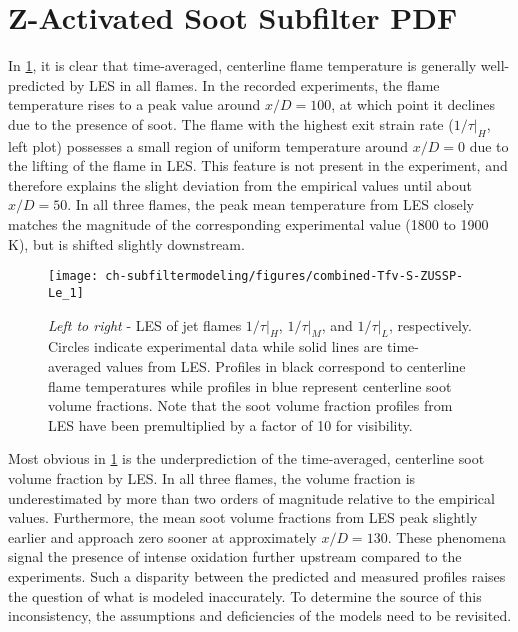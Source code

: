 \section{Z-Activated Soot Subfilter PDF}
\label{sec:lesresults:zassp}

In \cref{fig:subfilter:leszussp:zusspleseval}, it is clear that time-averaged, centerline flame temperature is generally well-predicted by LES in all flames. In the recorded experiments, the flame temperature rises to a peak value around $x/D = 100$, at which point it declines due to the presence of soot. The flame with the highest exit strain rate ($1/\tau|_H$, left plot) possesses a small region of uniform temperature around $x/D = 0$ due to the lifting of the flame in LES. This feature is not present in the experiment, and therefore explains the slight deviation from the empirical values until about $x/D = 50$. In all three flames, the peak mean temperature from LES closely matches the magnitude of the corresponding experimental value (1800 to 1900 K), but is shifted slightly downstream.

\begin{figure}[htb]
  \centering
  \texttt{[image: ch-subfiltermodeling/figures/combined-Tfv-S-ZUSSP-Le\_1]}
  \caption[LES Validation of \texorpdfstring{$Z$}{Z}-Uniform Soot Subfilter PDF]{\textit{Left to right} - LES of jet flames $1/\tau|_H$, $1/\tau|_M$, and $1/\tau|_L$, respectively. Circles indicate experimental data while solid lines are time-averaged values from LES. Profiles in black correspond to centerline flame temperatures while profiles in blue represent centerline soot volume fractions. Note that the soot volume fraction profiles from LES have been premultiplied by a factor of 10 for visibility.}
  \label{fig:subfilter:leszussp:zusspleseval}
\end{figure}

Most obvious in \cref{fig:subfilter:leszussp:zusspleseval} is the underprediction of the time-averaged, centerline soot volume fraction by LES. In all three flames, the volume fraction is underestimated by more than two orders of magnitude relative to the empirical values. Furthermore, the mean soot volume fractions from LES peak slightly earlier and approach zero sooner at approximately $x/D = 130$. These phenomena signal the presence of intense oxidation further upstream compared to the experiments. Such a disparity between the predicted and measured profiles raises the question of what is modeled inaccurately. To determine the source of this inconsistency, the assumptions and deficiencies of the models need to be revisited.

